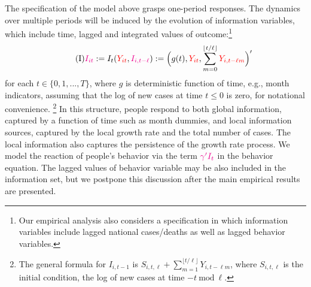 \documentclass[3p, longtitle]{elsarticle}
\theoremstyle{definition}
\def\icolor{\color{magenta}}
\def\ycolor{\color{red}}
\begin{document}


The specification of the model above grasps one-period responses.  The dynamics over multiple periods will be induced by the evolution
of information variables, which include time, lagged and integrated values of outcome:\footnote{Our empirical analysis also considers a specification in which information variables include lagged national cases/deaths as well as lagged behavior variables.}
\begin{equation}\label{eq:I}\tag{I}
 {\icolor I_{it} } := I_t( {\ycolor Y_{it}},  { \icolor  I_{i, t-\ell} }) := \Big (g(t) , {\ycolor Y_{it}},  \sum_{m=0}^{ \lfloor t/\ell \rfloor}
{\ycolor Y_{i,t - \ell m}} \Big )'  \end{equation}
 for  each  $t \in \{0,1,...,T\}$, where $g$ is deterministic function of time, e.g., month indicators,
 assuming that the log of new cases at time $t \leq 0$ is zero, for notational convenience.
 \footnote{The general formula  for  $I_{i, t-1}$ is $
S_{i, t, \ell } + \sum_{m=1}^{ \lfloor t/\ell \rfloor} Y_{i,t - \ell m}$, where $ S_{i, t, \ell }$ is the initial condition, the log of new cases at time $- t \ \mathrm{ mod } \ \ell$.} In this structure, people respond to both global information, captured by a function of time such as month dummies, and local information sources, captured by the local growth rate and the total number of cases. The local information also captures the persistence of the growth rate process.  We model the reaction of people's behavior via the term ${\icolor \gamma'I_{t}}$ in the behavior equation.  The  lagged values of behavior variable may be also included in the information set, but we postpone this discussion after the main empirical results are presented.
\end{document}
